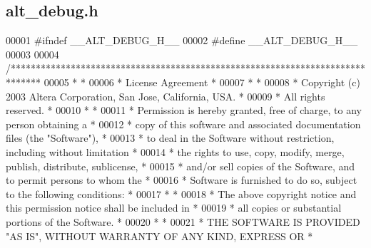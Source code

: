 \subsection{alt\+\_\+debug.\+h}
\label{alt__debug_8h_source}

\begin{DoxyCode}
00001 \textcolor{preprocessor}{#ifndef \_\_ALT\_DEBUG\_H\_\_}
00002 \textcolor{preprocessor}{#define \_\_ALT\_DEBUG\_H\_\_}
00003 
00004 \textcolor{comment}{/******************************************************************************}
00005 \textcolor{comment}{*                                                                             *}
00006 \textcolor{comment}{* License Agreement                                                           *}
00007 \textcolor{comment}{*                                                                             *}
00008 \textcolor{comment}{* Copyright (c) 2003 Altera Corporation, San Jose, California, USA.           *}
00009 \textcolor{comment}{* All rights reserved.                                                        *}
00010 \textcolor{comment}{*                                                                             *}
00011 \textcolor{comment}{* Permission is hereby granted, free of charge, to any person obtaining a     *}
00012 \textcolor{comment}{* copy of this software and associated documentation files (the "Software"),  *}
00013 \textcolor{comment}{* to deal in the Software without restriction, including without limitation   *}
00014 \textcolor{comment}{* the rights to use, copy, modify, merge, publish, distribute, sublicense,    *}
00015 \textcolor{comment}{* and/or sell copies of the Software, and to permit persons to whom the       *}
00016 \textcolor{comment}{* Software is furnished to do so, subject to the following conditions:        *}
00017 \textcolor{comment}{*                                                                             *}
00018 \textcolor{comment}{* The above copyright notice and this permission notice shall be included in  *}
00019 \textcolor{comment}{* all copies or substantial portions of the Software.                         *}
00020 \textcolor{comment}{*                                                                             *}
00021 \textcolor{comment}{* THE SOFTWARE IS PROVIDED "AS IS", WITHOUT WARRANTY OF ANY KIND, EXPRESS OR  *}

\end{DoxyCode}

